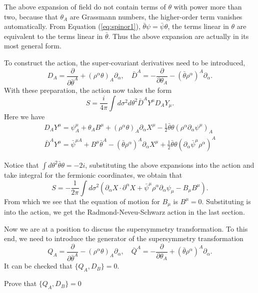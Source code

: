 \documentclass[graybox,envcountchap,sectrefs]{svmono}
\begin{document}
The above expansion of field do not contain terms of $\theta$ with power more than two, because that $\theta_A$ are Grassmann numbers, the higher-order term vanishes automatically. From Equation (\ref{eq:spinor1}), $\bar{\theta}\psi=\bar{\psi}\theta$, the terms linear in $\theta$ are equivalent to the terms linear in $\bar{\theta}$. Thus the above expansion are actually in its most general form.

To construct the action, the super-covariant derivatives need to be introduced,
\begin{equation}
D_A=\frac{\partial}{\partial \bar{\theta}^A}+(\rho^{\alpha}\theta)_A\partial_{\alpha}, \quad \bar{D}^A=-\frac{\partial}{\partial \theta_A}-(\bar{\theta}\rho^{\alpha})^A\partial_{\alpha}.
\end{equation}
With these preparation, the action now takes the form
\begin{equation}
S=\frac{i}{4\pi}\int d\sigma^2d\theta^2 \bar{D}^AY^{\mu}D_AY_{\mu}.	
\end{equation}
Here we have
\begin{equation}
\begin{aligned}
D_A Y^{\mu}=\psi^{\mu}_A+\theta_A B^{\mu}+(\rho^{\alpha} \theta)_A \partial_{\alpha} X^{\mu}-\frac{1}{2} \bar{\theta} \theta (\rho^{\alpha} \partial_{\alpha} \psi^{\mu})_A \\
\bar{D}^A Y^{\mu}=\bar{\psi}^{\mu A}+B^{\mu} \bar{\theta}^A-(\bar{\theta} \rho^{\alpha})^A\partial_{\alpha} X^{\mu} +\frac{1}{2} \bar{\theta} \theta (\partial_{\alpha} \bar{\psi}^{\mu} \rho^{\alpha})^A
\end{aligned}
\end{equation}

Notice that $\int d\theta^2 \bar{\theta}\theta=-2i$, substituting the above expansions into the action and take integral for the fermionic coordinates, we obtain that
\begin{equation}
S=-\frac{1}{2\pi}\int d\sigma^2 (\partial_{\alpha}X\cdot \partial^{\alpha}X+\bar{\psi}^{\mu}\rho^{\alpha}\partial_{\alpha}\psi_{\mu}-B_{\mu}B^{\mu}).	
\end{equation}
From which we see that the equation of motion for $B_{\mu}$ is $B^{\mu}=0$. Substituting is into the action, we get the Radmond-Neveu-Schwarz action in the last section.



Now we are at a position to discuss the supersymmetry transformation. 
To this end, we need to introduce the generator of the supersymmetry transformation
\begin{equation}
Q_A=\frac{\partial}{\partial \bar{\theta}^A}-(\rho^{\alpha}\theta)_A\partial_{\alpha},\quad \bar{Q}^{A}=-\frac{\partial}{\partial \theta_A}+(\bar{\theta}\rho^{\alpha})^A\partial_{\alpha}.
\end{equation}
It can be checked that $\{Q_A,D_B\}=0$.
\begin{exercise}
Prove that	 $\{Q_A,D_B\}=0$
\end{exercise}
\end{document}
